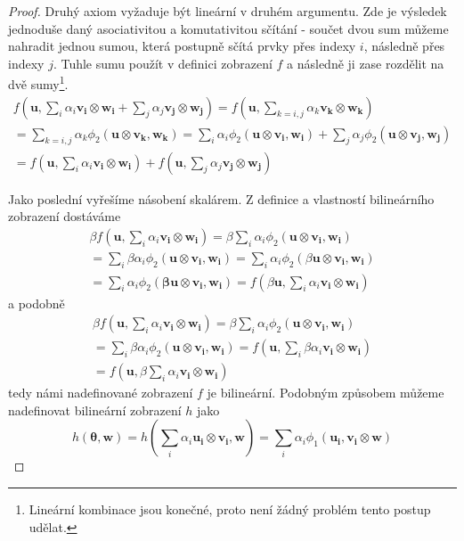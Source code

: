 \documentclass[a5paper,12pt]{amsbook}
\theoremstyle{definition}
\newcommand{\myvec}[1]{\bm{#1}}
\begin{document}
\begin{proof}
\noindent
Druhý axiom vyžaduje být lineární v druhém argumentu. Zde je výsledek jednoduše daný asociativitou
a komutativitou sčítání - součet dvou sum můžeme nahradit jednou sumou, která postupně sčítá prvky
přes indexy $i$, následně přes indexy $j$. Tuhle sumu použít v definici zobrazení $f$ a následně
ji zase rozdělit na dvě sumy\footnote{Lineární kombinace jsou konečné, proto není žádný problém
tento postup udělat.}.
\begin{equation*}
\begin{split}
f(\myvec{u}, \sum_{i}\alpha_i\myvec{v_i}\otimes\myvec{w_i} + \sum_{j}\alpha_j\myvec{v_j}\otimes\myvec{w_j})
= f(\myvec{u}, \sum_{k=i,j}\alpha_k\myvec{v_k}\otimes\myvec{w_k}) \\
= \sum_{k=i,j}\alpha_k\phi_2(\myvec{u}\otimes\myvec{v_k}, \myvec{w_k})
= \sum_{i}\alpha_i\phi_2(\myvec{u}\otimes\myvec{v_i}, \myvec{w_i})
    + \sum_{j}\alpha_j\phi_2(\myvec{u}\otimes\myvec{v_j}, \myvec{w_j}) \\
= f(\myvec{u}, \sum_{i}\alpha_i\myvec{v_i}\otimes\myvec{w_i}) 
    + f(\myvec{u}, \sum_{j}\alpha_j\myvec{v_j}\otimes\myvec{w_j})
\end{split}
\end{equation*}

\noindent
Jako poslední vyřešíme násobení skalárem. Z definice a vlastností bilineárního zobrazení dostáváme
\begin{equation*}
\begin{split}
\beta f(\myvec{u}, \sum_{i}\alpha_i\myvec{v_i}\otimes\myvec{w_i})
= \beta \sum_{i}\alpha_i\phi_2(\myvec{u}\otimes\myvec{v_i}, \myvec{w_i}) \\
= \sum_{i}\beta\alpha_i\phi_2(\myvec{u}\otimes\myvec{v_i}, \myvec{w_i})
= \sum_{i}\alpha_i\phi_2(\beta\myvec{u}\otimes\myvec{v_i}, \myvec{w_i}) \\
= \sum_{i}\alpha_i\phi_2(\myvec{\beta u}\otimes\myvec{v_i}, \myvec{w_i})
= f(\beta\myvec{u}, \sum_{i}\alpha_i\myvec{v_i}\otimes\myvec{w_i})
\end{split}
\end{equation*}
a podobně
\begin{equation*}
\begin{split}
\beta f(\myvec{u}, \sum_{i}\alpha_i\myvec{v_i}\otimes\myvec{w_i})
= \beta \sum_{i}\alpha_i\phi_2(\myvec{u}\otimes\myvec{v_i}, \myvec{w_i}) \\
= \sum_{i}\beta\alpha_i\phi_2(\myvec{u}\otimes\myvec{v_i}, \myvec{w_i})
= f(\myvec{u}, \sum_{i}\beta\alpha_i\myvec{v_i}\otimes\myvec{w_i}) \\
= f(\myvec{u}, \beta\sum_{i}\alpha_i\myvec{v_i}\otimes\myvec{w_i})
\end{split}
\end{equation*}
tedy námi nadefinované zobrazení $f$ je bilineární. Podobným způsobem můžeme nadefinovat
bilineární zobrazení $h$ jako
\begin{equation*}
h(\myvec{\theta}, \myvec{w}) = h(\sum_{i}\alpha_i\myvec{u_i}\otimes\myvec{v_i}, \myvec{w}) 
= \sum_{i}\alpha_i\phi_1(\myvec{u_i}, \myvec{v_i}\otimes\myvec{w})
\end{equation*}


\end{proof}
\end{document}
